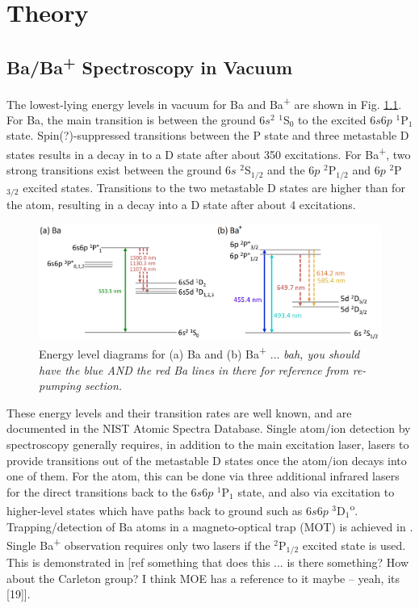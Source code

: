 \chapter{Theory}


\section{Ba/Ba\textsuperscript{+} Spectroscopy in Vacuum}

The lowest-lying energy levels in vacuum for Ba and Ba\textsuperscript{+} are shown in Fig. \ref{fig:elevs}.  For Ba, the main transition is between the ground $6s^{2}$ $^{1}$S$_{0}$ to the excited $6s6p$ $^{1}$P$_{1}$ state.  Spin{\color{red}(?)}-suppressed transitions between the P state and three metastable D states results in a decay in to a D state after about 350 excitations.  For Ba\textsuperscript{+}, two strong transitions exist between the ground $6s$ $^{2}$S$_{1/2}$ and the $6p$ $^{2}$P$_{1/2}$ and $6p$ $^{2}$P$_{3/2}$ excited states.  Transitions to the two metastable D states are higher than for the atom, resulting in a decay into a D state after about 4 excitations.

\begin{figure}[H]
	\includegraphics[width=.9\textwidth]{figures/elevs.png}
	\caption{Energy level diagrams for (a) Ba and (b) Ba\textsuperscript{+} ... \emph{\color{red}bah, you should have the blue AND the red Ba lines in there for reference from re-pumping section.}}
    \label{fig:elevs}
\end{figure}

These energy levels and their transition rates are well known, and are documented in the NIST Atomic Spectra Database.  Single atom/ion detection by spectroscopy generally requires, in addition to the main excitation laser, lasers to provide transitions out of the metastable D states once the atom/ion decays into one of them.  For the atom, this can be done via three additional infrared lasers for the direct transitions back to the $6s6p$ $^{1}$P$_{1}$ state, and also via excitation to higher-level states which have paths back to ground such as $6s6p$ $^{3}$D$_{1}$\textsuperscript{o}.  Trapping/detection of Ba atoms in a magneto-optical trap (MOT) is achieved in \cite{BaMOT}.  Single Ba\textsuperscript{+} observation requires only two lasers if the $^{2}$P$_{1/2}$ excited state is used.  This is demonstrated in [ref something that does this ... is there something?  How about the Carleton group?  I think MOE has a reference to it maybe -- yeah, its [19]].

